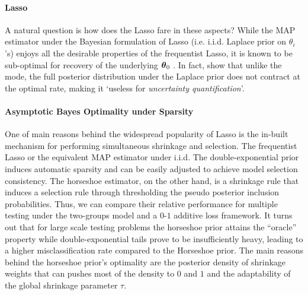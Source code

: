 \documentclass[11pt]{article}
\begin{document}
\paragraph{Lasso}

A natural question is how does the Lasso fare in these aspects? While the MAP estimator under the Bayesian formulation of Lasso (i.e. i.i.d. Laplace prior on $\theta_i$'s) enjoys all the desirable properties of the frequentist Lasso, it is known to be sub-optimal for recovery of the underlying $\boldsymbol{\theta}_0$ \citep{castillo2012needles}. In fact, \cite{castillo2012needles} show that unlike the mode, the full posterior distribution under the Laplace prior does not contract at the optimal rate, making it `useless for \textit{uncertainty quantification}'. 


\paragraph{Asymptotic Bayes Optimality under Sparsity}

One of main reasons behind the widespread popularity of Lasso is the in-built
mechanism for performing simultaneous shrinkage and selection. The frequentist
Lasso or the equivalent MAP estimator under i.i.d.  The double-exponential
prior induces automatic sparsity and can be easily adjusted to achieve model
selection consistency. The horseshoe estimator, on the other hand, is a
shrinkage rule that induces a selection rule through thresholding the pseudo
posterior inclusion probabilities. Thus, we can compare their relative
performance for multiple testing under the two-groups model and a $0$-$1$
additive loss framework. It turns out that for large scale testing problems the
horseshoe prior attains the ``oracle'' property while double-exponential tails prove
to be insufficiently heavy, leading to a higher misclassification rate compared
to the Horseshoe prior. The main reasons behind the horseshoe prior's
optimality are the posterior density of shrinkage weights that can pushes most
of the density to $0$ and $1$ and the adaptability of the global shrinkage
parameter $\tau$. 
\end{document}
